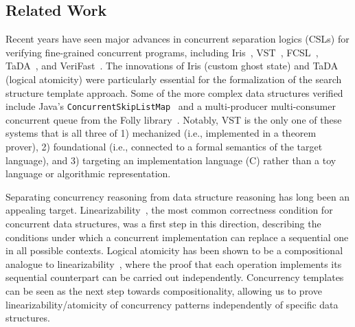 \documentclass[sigplan,screen]{acmart}
\begin{document}
\subsection*{Related Work}
Recent years have seen major advances in concurrent separation logics (CSLs) for verifying fine-grained concurrent programs, including Iris~\cite{iris}, VST~\cite{plcc,iris-vst-arxiv}, FCSL~\cite{fcsl}, TaDA~\cite{tada}, and VeriFast~\cite{verifast-conc}. The innovations of Iris (custom ghost state) and TaDA (logical atomicity) were particularly essential for the formalization of the search structure template approach. Some of the more complex data structures verified include Java's \lstinline{ConcurrentSkipListMap}~\cite{Xiong2017Abstract} and a multi-producer multi-consumer concurrent queue from the Folly library~\cite{iris-folly}. Notably, VST is the only one of these systems that is all three of 1) mechanized (i.e., implemented in a theorem prover), 2) foundational (i.e., connected to a formal semantics of the target language), and 3) targeting an implementation language (C) rather than a toy language or algorithmic representation. %


Separating concurrency reasoning from data structure reasoning has long been an appealing target. Linearizability~\cite{linearizability}, the most common correctness condition for concurrent data structures, was a first step in this direction, describing the conditions under which a concurrent implementation can replace a sequential one in all possible contexts. Logical atomicity has been shown to be a compositional analogue to linearizability~\cite{la-lin}, where the proof that each operation implements its sequential counterpart can be carried out independently. Concurrency templates can be seen as the next step towards compositionality, allowing us to prove linearizability/atomicity of concurrency patterns independently of specific data structures.
\end{document}
